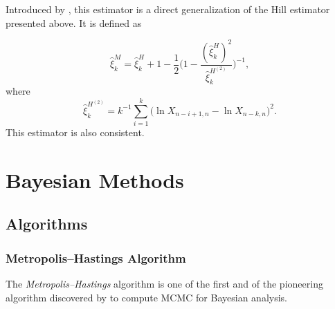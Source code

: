 Introduced by \cite{dekkers_moment_1989}, this estimator is a direct generalization of the Hill estimator presented above. It is defined as

\begin{equation}
\hat{\xi}^M_k=\hat{\xi}_k^H+1-\frac{1}{2}\Bigg(1-\frac{(\hat{\xi}_k^H)^2}{\hat{\xi}^{H^{(2)}}_k }\Bigg)^{-1},
\end{equation}
where
\begin{equation*}
\hat{\xi}^{H^{(2)}}_k=k^{-1}\sum_{i=1}^k\big(\ln X_{n-i+1,n}-\ln X_{n-k,n}\big)^2.
\end{equation*}
This estimator is also consistent.  





\chapter{Bayesian Methods}\label{appB}

\section{Algorithms}

\subsection{Metropolis–Hastings Algorithm}

The \emph{Metropolis–Hastings} algorithm is one of the first and of the pioneering algorithm discovered by \cite{hastings_monte_1970} to compute  MCMC for Bayesian analysis.

